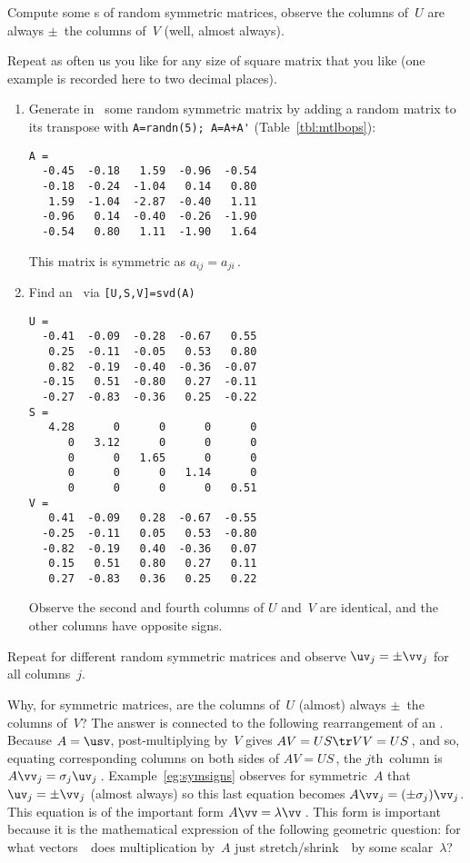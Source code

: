 \begin{example} \label{eg:symsigns}
Compute some \svd{}s of random symmetric matrices, observe the columns of~\(U\) are always \(\pm\)~the columns of~\(V\) (well, almost always).
\begin{solution} 
Repeat as often us you like for any size of square matrix that you like  (one example is recorded here to two decimal places).  
\begin{enumerate}
\item Generate in \script\ some random symmetric matrix by adding a random matrix to its transpose with \verb|A=randn(5); A=A+A'| (Table~\ref{tbl:mtlbops}):
\setbox\ajrqrbox\hbox{}%
\marginpar{\usebox{\ajrqrbox\\[2ex]}}%
\begin{verbatim}
A =
  -0.45  -0.18   1.59  -0.96  -0.54
  -0.18  -0.24  -1.04   0.14   0.80
   1.59  -1.04  -2.87  -0.40   1.11
  -0.96   0.14  -0.40  -0.26  -1.90
  -0.54   0.80   1.11  -1.90   1.64
\end{verbatim}
This matrix is symmetric as \(a_{ij}=a_{ji}\)\,.
\item Find an \svd\ via \verb|[U,S,V]=svd(A)|
\begin{verbatim}
U =
  -0.41  -0.09  -0.28  -0.67   0.55
   0.25  -0.11  -0.05   0.53   0.80
   0.82  -0.19  -0.40  -0.36  -0.07
  -0.15   0.51  -0.80   0.27  -0.11
  -0.27  -0.83  -0.36   0.25  -0.22
S =
   4.28      0      0      0      0
      0   3.12      0      0      0
      0      0   1.65      0      0
      0      0      0   1.14      0
      0      0      0      0   0.51
V =
   0.41  -0.09   0.28  -0.67  -0.55
  -0.25  -0.11   0.05   0.53  -0.80
  -0.82  -0.19   0.40  -0.36   0.07
   0.15   0.51   0.80   0.27   0.11
   0.27  -0.83   0.36   0.25   0.22
\end{verbatim}
Observe the second and fourth columns of \(U\) and~\(V\) are identical, and the other columns have opposite signs.
\end{enumerate}
Repeat for different random symmetric matrices and observe \(\uv_j=\pm \vv_j\) for all columns~\(j\).
\end{solution}
\end{example}

Why, for symmetric matrices, are the columns of~\(U\) (almost) always \(\pm\)~the columns of~\(V\)?
The answer is connected to the following rearrangement of an \svd.  
Because \(A=\usv\), post-multiplying by~\(V\) gives \(AV=US\tr VV=US\)\,, and so, equating corresponding columns on both sides of \(AV=US\)\,, the \(j\)th~column is \(A\vv_j=\sigma_j\uv_j\)\,.
Example~\ref{eg:symsigns} observes for symmetric~\(A\) that \(\uv_j=\pm\vv_j\) (almost always) so this last equation becomes \(A\vv_j=(\pm \sigma_j)\vv_j\).
This equation is of the important form \(A\vv=\lambda\vv\)\,.
This form is important because it is the mathematical expression of the following geometric question: for what vectors~\vv\ does multiplication by~\(A\) just stretch\slash shrink~\vv\ by some scalar~\(\lambda\)?

